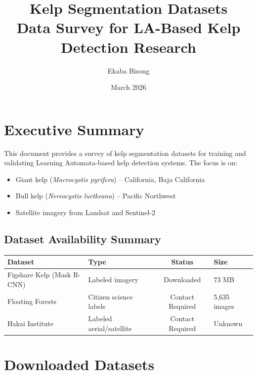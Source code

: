 \documentclass[11pt]{article}
\title{\textbf{Kelp Segmentation Datasets}\\[0.5em]
\large Data Survey for LA-Based Kelp Detection Research}
\author{Ekaba Bisong}
\date{March 2026}
\begin{document}
\maketitle
\tableofcontents


\section{Executive Summary}

This document provides a survey of kelp segmentation datasets for training and validating Learning Automata-based kelp detection systems. The focus is on:
\begin{itemize}
  \item Giant kelp (\textit{Macrocystis pyrifera}) -- California, Baja California
  \item Bull kelp (\textit{Nereocystis luetkeana}) -- Pacific Northwest
  \item Satellite imagery from Landsat and Sentinel-2
\end{itemize}

\subsection*{Dataset Availability Summary}

\begin{center}
\begin{tabular}{llcl}
\toprule
\textbf{Dataset} & \textbf{Type} & \textbf{Status} & \textbf{Size} \\
\midrule
Figshare Kelp (Mask R-CNN) & Labeled imagery & \textcolor{available}{Downloaded} & 73 MB \\
Floating Forests & Citizen science labels & \textcolor{contact}{Contact Required} & 5,635 images \\
Hakai Institute & Labeled aerial/satellite & \textcolor{contact}{Contact Required} & Unknown \\
\bottomrule
\end{tabular}
\end{center}

\section{Downloaded Datasets}
\end{document}
